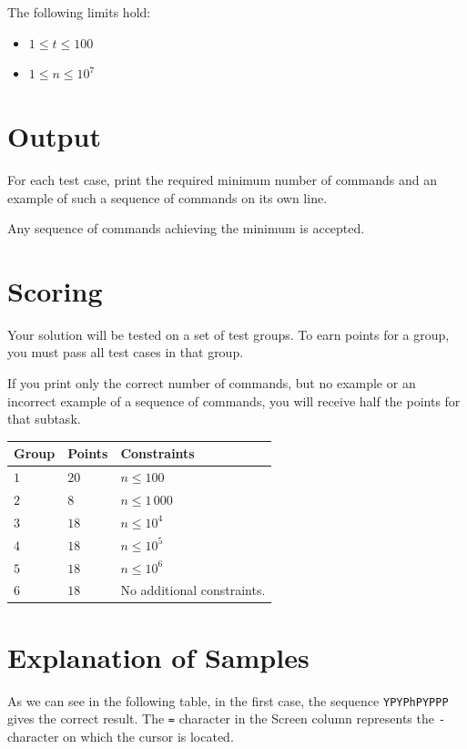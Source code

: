The following limits hold:
\begin{itemize}
  \item $1 \leq t \leq 100$
  \item $1 \leq n \leq 10^7$
\end{itemize}

\section*{Output}
For each test case, print the required minimum number of commands and an example
of such a sequence of commands on its own line.

Any sequence of commands achieving the minimum is accepted.

\section*{Scoring}
Your solution will be tested on a set of test groups.
To earn points for a group, you must pass all test cases in that group.

If you print only the correct number of commands, but no example or an incorrect
example of a sequence of commands, you will receive half the points for that
subtask.

\noindent
\begin{tabular}{| l | l | p{12cm} |}
  \hline
  \textbf{Group} & \textbf{Points} & \textbf{Constraints} \\ \hline
  $1$ & $20$ & $n \leq 100$ \\ \hline
  $2$ & $8$  & $n \leq 1\,000$ \\ \hline
  $3$ & $18$ & $n \leq 10^4$ \\ \hline
  $4$ & $18$ & $n \leq 10^5$ \\ \hline
  $5$ & $18$ & $n \leq 10^6$ \\ \hline
  $6$ & $18$ & No additional constraints. \\ \hline
\end{tabular}

\section*{Explanation of Samples}
As we can see in the following table, in the first case, the sequence
\texttt{YPYPhPYPPP} gives the correct result. The \texttt{=} character in the
Screen column represents the \texttt{-} character on which the cursor is
located.

